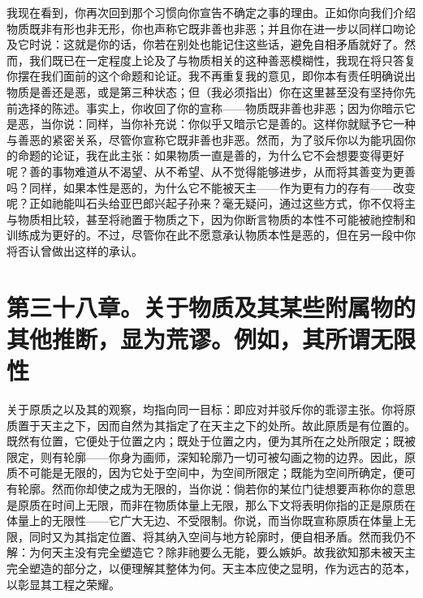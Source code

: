 我现在看到，你再次回到那个习惯向你宣告不确定之事的理由。正如你向我们介绍物质既非有形也非无形，你也声称它既非善也非恶；并且你在进一步以同样口吻论及它时说：这就是你的话，你若在别处也能记住这些话，避免自相矛盾就好了。然而，我们既已在一定程度上论及了与物质相关的这种善恶模糊性，我现在将只答复你摆在我们面前的这个命题和论证。我不再重复我的意见，即你本有责任明确说出物质是善还是恶，或是第三种状态；但（我必须指出）你在这里甚至没有坚持你先前选择的陈述。事实上，你收回了你的宣称——物质既非善也非恶；因为你暗示它是恶，当你说：同样，当你补充说：你似乎又暗示它是善的。这样你就赋予它一种与善恶的紧密关系，尽管你宣称它既非善也非恶。然而，为了驳斥你以为能巩固你的命题的论证，我在此主张：如果物质一直是善的，为什么它不会想要变得更好呢？善的事物难道从不渴望、从不希望、从不觉得能够进步，从而将其善变为更善吗？同样，如果本性是恶的，为什么它不能被天主——作为更有力的存有——改变呢？正如祂能叫石头给亚巴郎兴起子孙来？毫无疑问，通过这些方式，你不仅将主与物质相比较，甚至将祂置于物质之下，因为你断言物质的本性不可能被祂控制和训练成为更好的。不过，尽管你在此不愿意承认物质本性是恶的，但在另一段中你将否认曾做出这样的承认。\par


\section{第三十八章。关于物质及其某些附属物的其他推断，显为荒谬。例如，其所谓无限性}

关于原质之以及其的观察，均指向同一目标：即应对并驳斥你的乖谬主张。你将原质置于天主之下，因而自然为其指定了在天主之下的处所。故此原质是有位置的。既然有位置，它便处于位置之内；既处于位置之内，便为其所在之处所限定；既被限定，则有轮廓——你身为画师，深知轮廓乃一切可被勾画之物的边界。因此，原质不可能是无限的，因为它处于空间中，为空间所限定；既能为空间所确定，便可有轮廓。然而你却使之成为无限的，当你说：倘若你的某位门徒想要声称你的意思是原质在时间上无限，而非在物质体量上无限，那么下文将表明你指的正是原质在体量上的无限性——它广大无边、不受限制。你说，而当你既宣称原质在体量上无限，同时又为其指定位置、将其纳入空间与地方轮廓时，便自相矛盾。然而我仍不解：为何天主没有完全塑造它？除非祂要么无能，要么嫉妒。故我欲知那未被天主完全塑造的部分之，以便理解其整体为何。天主本应使之显明，作为远古的范本，以彰显其工程之荣耀。\par


